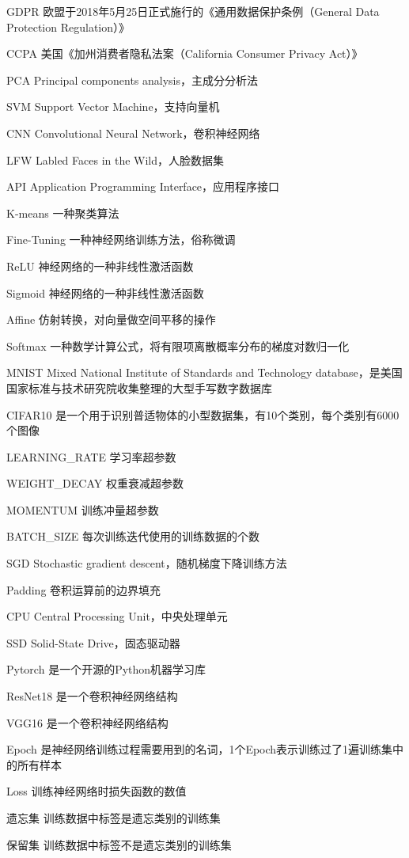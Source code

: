 
\begin{denotation}[3cm]
  \item[GDPR] 欧盟于2018年5月25日正式施行的《通用数据保护条例（General Data
  Protection Regulation）》
  \item[CCPA] 美国《加州消费者隐私法案（California Consumer Privacy Act）》 
  \item[PCA] Principal components analysis，主成分分析法
  \item[SVM] Support Vector Machine，支持向量机
  \item[CNN] Convolutional Neural Network，卷积神经网络
  \item[LFW] Labled Faces in the Wild，人脸数据集
  \item[API] Application Programming Interface，应用程序接口
  \item[K-means] 一种聚类算法
  \item[Fine-Tuning] 一种神经网络训练方法，俗称微调
  \item[ReLU] 神经网络的一种非线性激活函数
  \item[Sigmoid] 神经网络的一种非线性激活函数
  \item[Affine] 仿射转换，对向量做空间平移的操作
  \item[Softmax] 一种数学计算公式，将有限项离散概率分布的梯度对数归一化
  \item[MNIST] Mixed National Institute of Standards and Technology database，是美国国家标准与技术研究院收集整理的大型手写数字数据库
  \item[CIFAR10] 是一个用于识别普适物体的小型数据集，有10个类别，每个类别有6000个图像
  \item[LEARNING\_RATE] 学习率超参数
  \item[WEIGHT\_DECAY] 权重衰减超参数
  \item[MOMENTUM] 训练冲量超参数  
  \item[BATCH\_SIZE] 每次训练迭代使用的训练数据的个数
  \item[SGD]   Stochastic gradient descent，随机梯度下降训练方法
  \item[Padding] 卷积运算前的边界填充
  \item[CPU] Central Processing Unit，中央处理单元
  \item[SSD] Solid-State Drive，固态驱动器
  \item[Pytorch] 是一个开源的Python机器学习库
  \item[ResNet18] 是一个卷积神经网络结构
  \item[VGG16] 是一个卷积神经网络结构
  \item[Epoch] 是神经网络训练过程需要用到的名词，1个Epoch表示训练过了1遍训练集中的所有样本
  \item[Loss] 训练神经网络时损失函数的数值
  \item[遗忘集] 训练数据中标签是遗忘类别的训练集 
  \item[保留集]  训练数据中标签不是遗忘类别的训练集
\end{denotation}



